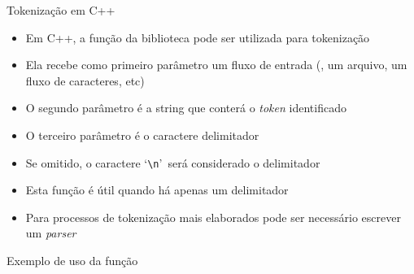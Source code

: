 \begin{frame}[fragile]{Tokenização em C++}

    \begin{itemize}
        \item Em C++, a função  da biblioteca  pode ser 
            utilizada para tokenização
        \pause

        \item Ela recebe como primeiro parâmetro um fluxo de entrada (, um arquivo, 
            um fluxo de caracteres, etc)
        \pause

        \item O segundo parâmetro é a string que conterá o \textit{token} identificado 
        \pause

        \item O terceiro parâmetro é o caractere delimitador
        \pause

        \item Se omitido, o caractere \lq\verb|\n|\rq\ será considerado o delimitador
        \pause

        \item Esta função é útil quando há apenas um delimitador
        \pause

        \item Para processos de tokenização mais elaborados pode ser necessário escrever um \textit{parser}

    \end{itemize}

\end{frame}

\begin{frame}[fragile]{Exemplo de uso da função }
\end{frame}


